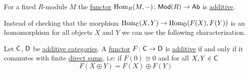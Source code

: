 \documentclass[../../main]{subfiles}
\begin{document}
\begin{example}
  For a fixed \(R\)-module \(M\) the \hyperref[def:functor]{functor} \(\operatorname{Hom}_{R}(M, -)\colon \mathsf{Mod}(R) \to \mathsf{Ab}\) is \hyperref[def:additive-functor]{additive}.
\end{example}

Instead of checking that the morphism \(\operatorname{Hom}_{\mathsf{C}}(X, Y) \to \operatorname{Hom}_{\mathsf{D}}(F(X), F(Y))\) is an homomorphism for all objects \(X\) and \(Y\) we can use the following characterization.
\begin{proposition}\label{prop:additive-functor-characterization}
  Let \(\mathsf{C}\), \(\mathsf{D}\) be \hyperref[def:additive-category]{additive categories}.
  A \hyperref[def:functor]{functor} \(F\colon \mathsf{C} \to \mathsf{D}\) is \hyperref[def:additive-functor]{additive} if and only if it commutes with finite \hyperref[def:direct-sum]{direct sums}, i.e: if \(F(0) \cong 0\) and for all \(X, Y \in \mathsf{C}\)
  \begin{equation*}
    F(X \oplus Y) = F(X) \oplus F(Y)
  \end{equation*}
\end{proposition}
\end{document}
